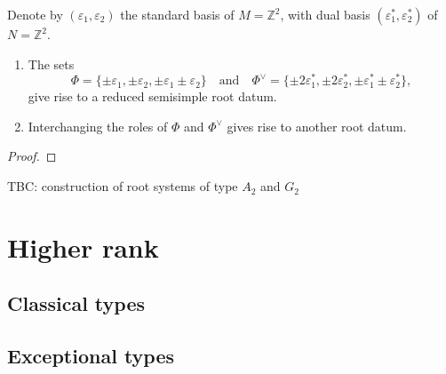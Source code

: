 \begin{lemma}

\end{lemma}





Denote by $(\varepsilon_1, \varepsilon_2)$ the standard basis 
of $M = \mathbb{Z}^2$, 
with dual basis $(\varepsilon_1^*, \varepsilon_2^*)$ of $N = \mathbb{Z}^2$.\\

\begin{lemma}
    \label{rank2:construct}
    \begin{enumerate}
        \item The sets 
\[
    \Phi = \{\pm \varepsilon_1, \pm \varepsilon_2, \pm\varepsilon_1\pm\varepsilon_2\} \quad \text{and} \quad
    \Phi^\vee = \{\pm 2\varepsilon^*_1, \pm 2 \varepsilon^*_2, \pm \varepsilon_1^* \pm \varepsilon_2^* \},
\]
give rise to a reduced semisimple root datum.
        \item Interchanging the roles of $\Phi$ and $\Phi^\vee$ gives rise to another root datum.
    \end{enumerate}
\end{lemma}
\begin{proof}

\end{proof}


\begin{lemma}
    TBC: construction of root systems of type $A_2$ and $G_2$
\end{lemma}

\section{Higher rank}
\label{sec:higher-rank}
\subsection{Classical types}
\label{subsec:classical-types}
\subsection{Exceptional types}